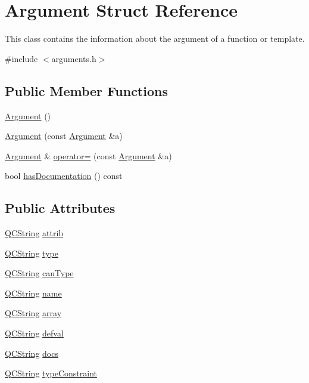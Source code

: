 \hypertarget{struct_argument}{}\section{Argument Struct Reference}
\label{struct_argument}


This class contains the information about the argument of a function or template.  




{\ttfamily \#include $<$arguments.\+h$>$}

\subsection*{Public Member Functions}
\begin{DoxyCompactItemize}
\item 
\mbox{\hyperlink{struct_argument_a21f78c9b347967aa8bf77e5d3f35592f}{Argument}} ()
\item 
\mbox{\hyperlink{struct_argument_a87adc78036a4e04a05692bd13f90d91a}{Argument}} (const \mbox{\hyperlink{struct_argument}{Argument}} \&a)
\item 
\mbox{\hyperlink{struct_argument}{Argument}} \& \mbox{\hyperlink{struct_argument_aeb2dc827f4c8a7f597f714b3995c20e4}{operator=}} (const \mbox{\hyperlink{struct_argument}{Argument}} \&a)
\item 
bool \mbox{\hyperlink{struct_argument_aca66c2b989361c43f7e1adfe9d7f125d}{has\+Documentation}} () const
\end{DoxyCompactItemize}
\subsection*{Public Attributes}
\begin{DoxyCompactItemize}
\item 
\mbox{\hyperlink{class_q_c_string}{Q\+C\+String}} \mbox{\hyperlink{struct_argument_aff930f2a4cb85b5616be79b81db2341f}{attrib}}
\item 
\mbox{\hyperlink{class_q_c_string}{Q\+C\+String}} \mbox{\hyperlink{struct_argument_a1ad588d2b3cc71fe3f74c8272b4ec32e}{type}}
\item 
\mbox{\hyperlink{class_q_c_string}{Q\+C\+String}} \mbox{\hyperlink{struct_argument_ac20b3c80630f773cf72f13c6e44b235a}{can\+Type}}
\item 
\mbox{\hyperlink{class_q_c_string}{Q\+C\+String}} \mbox{\hyperlink{struct_argument_a334668ce5d1f650c804e69f1bc941a3b}{name}}
\item 
\mbox{\hyperlink{class_q_c_string}{Q\+C\+String}} \mbox{\hyperlink{struct_argument_a9e33101befb3a977ac863d8a595ed210}{array}}
\item 
\mbox{\hyperlink{class_q_c_string}{Q\+C\+String}} \mbox{\hyperlink{struct_argument_a4fe1d9319dede52f7551f59297772efa}{defval}}
\item 
\mbox{\hyperlink{class_q_c_string}{Q\+C\+String}} \mbox{\hyperlink{struct_argument_a5d6cd35aa392b1703acf14104b19c589}{docs}}
\item 
\mbox{\hyperlink{class_q_c_string}{Q\+C\+String}} \mbox{\hyperlink{struct_argument_aef7bdd7c7d69ebad70624bfebdfa7404}{type\+Constraint}}
\end{DoxyCompactItemize}


